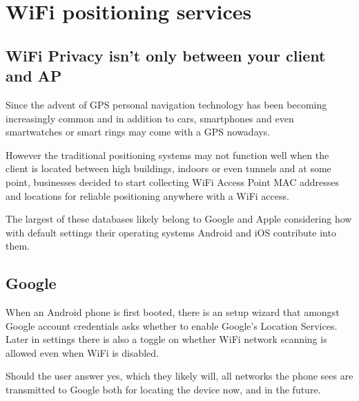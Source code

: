 \documentclass[../wifi-security.tex]{subfiles}
\begin{document}
\section{WiFi positioning services}

\subsection{WiFi Privacy isn't only between your client and AP}

Since the advent of GPS personal navigation technology has been becoming increasingly common and in addition to cars, smartphones and even smartwatches or smart rings may come with a GPS nowadays.

However the traditional positioning systems may not function well when the client is located between high buildings, indoors or even tunnels and at some point, businesses decided to start collecting WiFi Access Point MAC addresses and locations for reliable positioning anywhere with a WiFi access.

The largest of these databases likely belong to Google and Apple
considering how with default settings their operating systems Android and iOS contribute into them.



\subsection{Google}

When an Android phone is first booted, there is an setup wizard that amongst Google account credentials asks whether to enable Google's Location Services. Later in settings there is also a toggle on whether WiFi network scanning is allowed even when WiFi is disabled.

Should the user answer yes, which they likely will, all networks the phone sees are transmitted to Google both for locating the device now, and in the future.

\end{document}
